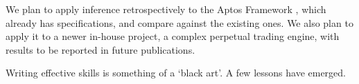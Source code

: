 \noindent We plan to apply inference retrospectively to the Aptos Framework \cite{TopoFrameworkBook}, which already has specifications, and compare against the existing ones.
We also plan to apply it to a newer in-house project, a complex perpetual trading engine, with results to be reported in future publications.

%



Writing effective skills is something of a `black art'. A few lessons have emerged.


